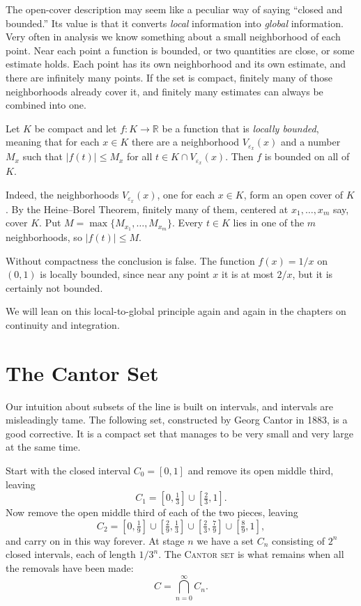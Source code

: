 The open-cover description may seem like a peculiar way of saying ``closed and bounded.''  Its value is that it converts \emph{local} information into \emph{global} information.  Very often in analysis we know something about a small neighborhood of each point.  Near each point a function is bounded, or two quantities are close, or some estimate holds.  Each point has its own neighborhood and its own estimate, and there are infinitely many points.  If the set is compact, finitely many of those neighborhoods already cover it, and finitely many estimates can always be combined into one.

\begin{example}
Let $K$ be compact and let $f : K \to \mathbb{R}$ be a function that is \emph{locally bounded}, meaning that for each $x \in K$ there are a neighborhood $V_{\varepsilon_x}(x)$ and a number $M_x$ such that $|f(t)| \leq M_x$ for all $t \in K \cap V_{\varepsilon_x}(x)$.  Then $f$ is bounded on all of $K$.

Indeed, the neighborhoods $V_{\varepsilon_x}(x)$, one for each $x \in K$, form an open cover of $K$.  By the Heine--Borel Theorem, finitely many of them, centered at $x_1, \ldots, x_m$ say, cover $K$.  Put $M = \max\{M_{x_1}, \ldots, M_{x_m}\}$.  Every $t \in K$ lies in one of the $m$ neighborhoods, so $|f(t)| \leq M$.

Without compactness the conclusion is false.  The function $f(x) = 1/x$ on $(0,1)$ is locally bounded, since near any point $x$ it is at most $2/x$, but it is certainly not bounded.
\end{example}

We will lean on this local-to-global principle again and again in the chapters on continuity and integration.

\section{The Cantor Set}

Our intuition about subsets of the line is built on intervals, and intervals are misleadingly tame.  The following set, constructed by Georg Cantor in 1883, is a good corrective.  It is a compact set that manages to be very small and very large at the same time.

Start with the closed interval $C_0 = [0,1]$ and remove its open middle third, leaving
\[ C_1 = \left[0, \tfrac13\right] \cup \left[\tfrac23, 1\right]. \]
Now remove the open middle third of each of the two pieces, leaving
\[ C_2 = \left[0, \tfrac19\right] \cup \left[\tfrac29, \tfrac13\right] \cup \left[\tfrac23, \tfrac79\right] \cup \left[\tfrac89, 1\right], \]
and carry on in this way forever.  At stage $n$ we have a set $C_n$ consisting of $2^n$ closed intervals, each of length $1/3^n$.  The \textsc{Cantor set} is what remains when all the removals have been made:
\[ C = \bigcap_{n=0}^{\infty} C_n. \]

